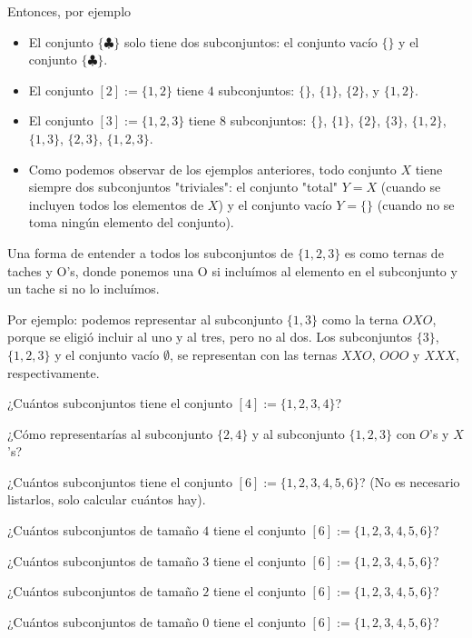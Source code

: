 Entonces, por ejemplo

\begin{itemize}
    \item El conjunto $\{\clubsuit\}$ solo tiene dos subconjuntos: el  conjunto vacío $\{\}$  y el conjunto $\{\clubsuit\}$. 
    \item El conjunto $[2]:=\{1,2\}$ tiene $4$ subconjuntos: $\{\}$, $\{1\}$, $\{2\}$, y $\{1,2\}$.
    \item El conjunto $[3]:=\{1,2,3\}$ tiene $8$ subconjuntos: $\{\}$, $\{1\}$, $\{2\}$, $\{3\}$, $\{1,2\}$, $\{1,3\}$, $\{2,3\}$, $\{1,2,3\}$.

    \item Como podemos observar de los ejemplos anteriores, todo conjunto $X$ tiene siempre dos subconjuntos "triviales": el conjunto "total" $Y=X$ (cuando se incluyen todos los elementos de $X$) y el conjunto vacío $Y = \{\}$ (cuando no se toma ningún elemento del conjunto).

\end{itemize}


Una forma de entender a todos los subconjuntos de $\{1,2,3\}$ es como ternas de taches y O's, donde ponemos una O si incluímos al elemento en el subconjunto y un tache si no lo incluímos. 

Por ejemplo: podemos representar al subconjunto $\{1,3\}$ como la terna $OXO$, porque se eligió incluir al uno y al tres, pero no al dos. Los subconjuntos $\{3\}$, $\{1,2,3\}$ y el conjunto vacío $\emptyset$, se representan con las ternas $XXO$, $OOO$ y $XXX$, respectivamente.

\begin{ejercicio}
¿Cuántos subconjuntos tiene el conjunto $[4]:=\{1,2,3,4\}$?

¿Cómo representarías al subconjunto $\{2,4\}$ y al subconjunto $\{1,2,3\}$ con $O$'s y $X$'s?
\end{ejercicio}
\vspace{1.5cm}

\begin{ejercicio}
¿Cuántos subconjuntos tiene el conjunto $[6]:=\{1,2,3,4,5,6\}$? (No es necesario listarlos, solo calcular cuántos hay).
\end{ejercicio}
\vspace{1cm}





\begin{ejercicio}
¿Cuántos subconjuntos de tamaño $4$ tiene el conjunto $[6]:=\{1,2,3,4,5,6\}$?

¿Cuántos subconjuntos de tamaño $3$ tiene el conjunto $[6]:=\{1,2,3,4,5,6\}$?

¿Cuántos subconjuntos de tamaño $2$ tiene el conjunto $[6]:=\{1,2,3,4,5,6\}$?

¿Cuántos subconjuntos de tamaño $0$ tiene el conjunto $[6]:=\{1,2,3,4,5,6\}$?
\end{ejercicio}
\vspace{2cm}

